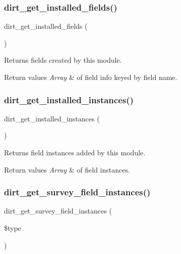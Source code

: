 \subsubsection{\texorpdfstring{dirt\+\_\+get\+\_\+installed\+\_\+fields()}{dirt\_get\_installed\_fields()}}
{\footnotesize\ttfamily dirt\+\_\+get\+\_\+installed\+\_\+fields (\begin{DoxyParamCaption}{ }\end{DoxyParamCaption})}

Returns fields created by this module.


\begin{DoxyRetVals}{Return values}
{\em Array} & of field info keyed by field name. \\
\hline
\end{DoxyRetVals}
\mbox{\label{dirt_8fields_8inc_ad3d38e927006f5a6e57dd0016ead4d49}} 
\subsubsection{\texorpdfstring{dirt\+\_\+get\+\_\+installed\+\_\+instances()}{dirt\_get\_installed\_instances()}}
{\footnotesize\ttfamily dirt\+\_\+get\+\_\+installed\+\_\+instances (\begin{DoxyParamCaption}{ }\end{DoxyParamCaption})}

Returns field instances added by this module.


\begin{DoxyRetVals}{Return values}
{\em Array} & of field instances. \\
\hline
\end{DoxyRetVals}
\mbox{\label{dirt_8fields_8inc_af0165a93ae54185d03d79d6a738fe204}} 
\subsubsection{\texorpdfstring{dirt\+\_\+get\+\_\+survey\+\_\+field\+\_\+instances()}{dirt\_get\_survey\_field\_instances()}}
{\footnotesize\ttfamily dirt\+\_\+get\+\_\+survey\+\_\+field\+\_\+instances (\begin{DoxyParamCaption}\item[{}]{\$type }\end{DoxyParamCaption})}

